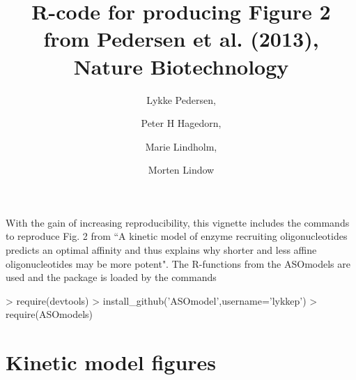 \documentclass{article}
\title{R-code for producing Figure 2 from Pedersen et al. (2013), Nature Biotechnology}
\author{Lykke Pedersen, \and Peter H Hagedorn, \and Marie Lindholm, \and Morten Lindow}
\date{}
\begin{document}



\maketitle
With the gain of increasing reproducibility, this vignette includes the commands to reproduce Fig. 2 from ``A kinetic model of enzyme recruiting oligonucleotides predicts an optimal affinity and thus explains why shorter and less affine oligonucleotides may be more potent". The R-functions from the ASOmodels are used and the package is loaded by the commands

\begin{Schunk}
\begin{Sinput}
> require(devtools)
> install_github('ASOmodel',username='lykkep')
> require(ASOmodels)
\end{Sinput}
\end{Schunk}

\section*{Kinetic model figures}
\end{document}
